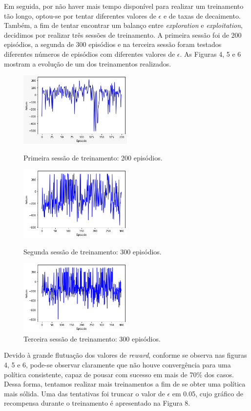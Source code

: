 \documentclass[letterpaper, 10 pt, conference]{ieeeconf}  %
\begin{document}
Em seguida, por não haver mais tempo disponível para realizar um treinamento tão longo, optou-se por tentar diferentes valores de $\epsilon$ e de taxas de decaimento. Também, a fim de tentar encontrar um balanço entre \emph{exploration} e \emph{exploitation}, decidimos por realizar três sessões de treinamento. A primeira sessão foi de 200 episódios, a segunda de 300 episódios e na terceira sessão foram testados diferentes números de episódios com diferentes valores de $\epsilon$. As Figuras 4, 5 e 6 mostram a evolução de um dos treinamentos realizados. 
\begin{figure}[H]
\centering
\includegraphics[width=0.5\textwidth]{t1.jpeg}
\caption{Primeira sessão de treinamento: 200 episódios.}
\label{fig:comparacao}
\includegraphics[width=0.5\textwidth]{t2.png}
\caption{Segunda sessão de treinamento: 300 episódios.}
\label{fig:comparacao}
\includegraphics[width=0.5\textwidth]{t3.png}
\caption{Terceira sessão de treinamento: 300 episódios.}
\label{fig:comparacao}
\end{figure}

Devido à grande flutuação dos valores de \emph{reward}, conforme se observa nas figuras 4, 5 e 6, pode-se observar claramente que não houve convergência para uma política consistente, capaz de pousar com sucesso em mais de 70\% dos casos. Dessa forma, tentamos realizar mais treinamentos a fim de se obter uma política mais sólida. Uma das tentativas foi truncar o valor de $\epsilon$ em 0.05, cujo gráfico de recompensa durante o treinamento é apresentado na Figura 8.
\end{document}
